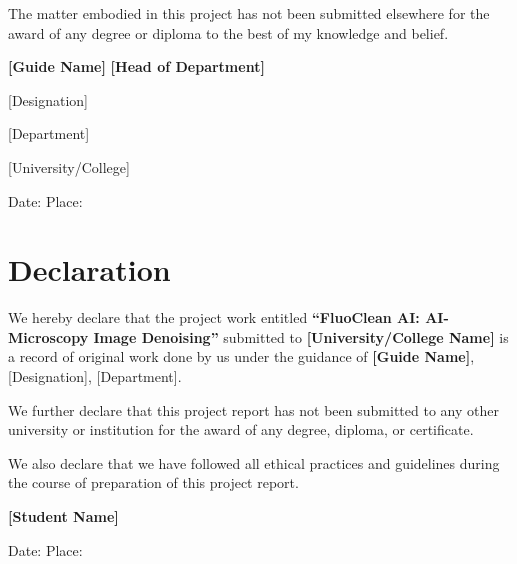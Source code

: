 \documentclass[12pt,a4paper]{report}
\begin{document}
\vspace{1cm}

\noindent The matter embodied in this project has not been submitted elsewhere for the award of any degree or diploma to the best of my knowledge and belief.

\vspace{2cm}

\noindent \textbf{[Guide Name]} \hfill \textbf{[Head of Department]}

\noindent [Designation] \hfill [Designation]

\noindent [Department] \hfill [Department]

 \hfill [University/College]

\vspace{1cm}

\noindent Date: \hfill Place:

\chapter*{Declaration}
\thispagestyle{plain}

\noindent We hereby declare that the project work entitled \textbf{``FluoClean AI: AI-Microscopy Image Denoising''} submitted to \textbf{[University/College Name]} is a record of original work done by us under the guidance of \textbf{[Guide Name]}, [Designation], [Department].

\vspace{1cm}

\noindent We further declare that this project report has not been submitted to any other university or institution for the award of any degree, diploma, or certificate.

\vspace{1cm}

\noindent We also declare that we have followed all ethical practices and guidelines during the course of preparation of this project report.

\vspace{2cm}

\noindent \textbf{[Student Name]}


\noindent [Branch]

\vspace{1cm}

\noindent Date: \hfill Place:

\end{document}
